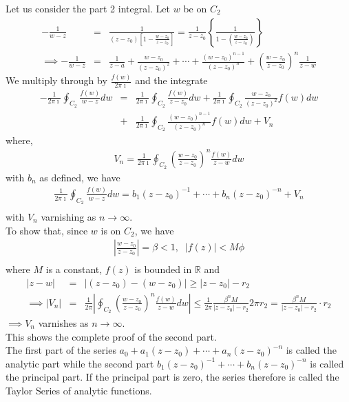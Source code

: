 \documentclass[12pt]{report}
\newcommand{\sps}{\\[0.2cm]}
\newcommand{\dsp}{\displaystyle}
\newcommand{\NI}{\noindent}
\newcommand{\real}{ \mathbb{R}}
\newcommand{\imaginary}{\imath}
\begin{document}
	\NI Let us consider the part 2 integral. Let $w$ be on $C_2$
	\begin{eqnarray*}
		-\frac{1}{w-z} &=& \frac{1}{\left(z-z_0\right)\left[1-\frac{w-z_0}{z-z_0}\right] } = \frac{1}{z-z_0}\left\{\frac{1}{1-\left(\frac{w-z_0}{z-z_0}\right)}\right\}\sps
		\implies -\frac{1}{w-z}&=& \frac{1}{z-a}+ \frac{w-z_0}{(z-z_0)^2} + \cdots + \frac{(w-z_0)^{n-1}}{(z-z_0)^n}+\left( \frac{w-z_0}{z-z_0} \right)^n\frac{1}{z-w}
	\end{eqnarray*}
	We multiply through by $\dsp \frac{f(w)}{2\pi\imaginary}$ and the integrate
	\begin{eqnarray*}
		-\frac{1}{2\pi\imaginary}\oint_{C_2}\frac{f(w)}{w-z}dw &=& \frac{1}{2\pi\imaginary}\oint_{C_2}\frac{f(w)}{z-z_0}dw + \frac{1}{2\pi\imaginary}\oint_{C_2}\frac{w-z_0}{(z-z_0)^2}f(w)dw\sps
		&+&\frac{1}{2\pi\imaginary}\oint_{C_2}\frac{(w-z_0)^{n-1}}{(z-z_0)^n}f(w)dw + V_n
	\end{eqnarray*}
	where,
	\begin{eqnarray*}
		V_n = \frac{1}{2\pi\imaginary}\oint_{C_2}\left( \frac{w-z_0}{z-z_0} \right)^n \frac{f(w)}{z-w}dw
	\end{eqnarray*}
	with $b_n$ as defined, we have
	\begin{eqnarray*}
		\frac{1}{2\pi\imaginary}\oint_{C_2}\frac{f(w)}{w-z}dw = b_1(z-z_0)^{-1} + \cdots + b_n(z-z_0)^{-n} + V_n\\
	\end{eqnarray*}
	with $V_n$ varnishing as $n\rightarrow\infty$.\sps
	To show that, since $w$ is on $C_2$, we have
	\begin{eqnarray*}
		\left| \frac{w-z_0}{z - z_0} \right| = \beta < 1,\;\; |f(z)| < M\phi\\
	\end{eqnarray*}
	where $M$ is a constant, $f(z)$ is bounded in $\real$ and \\
	\begin{eqnarray*}
		|z-w| &=& |(z-z_0) - (w-z_0) | \geq |z-z_0| - r_2\sps
		\implies |V_n| &=&\frac{1}{2\pi}\left| \oint_{C_2}\left( \frac{w-z_0}{z-z_0} \right)^n \frac{f(w)}{z-w} dw \right| \leq \frac{1}{2\pi}\frac{\beta^n M}{|z-z_0|-r_2} 2\pi r_2 = \frac{\beta^n M}{|z-z_0|-r_2} \cdot r_2 
	\end{eqnarray*}
	$\implies V_n$ varnishes as $n\rightarrow\infty$.\\
	This shows the complete proof of the second part.\\
	
	\NI The first part of the series $a_0 + a_1(z-z_0) + \cdots + a_n(z-z_0)^{-n}$ is called the analytic part while the second part $b_1(z-z_0)^{-1} + \cdots + b_n(z-z_0)^{-n}$ is called the principal part. If the principal part is zero, the series therefore is called the Taylor Series of analytic functions.
\end{document}
